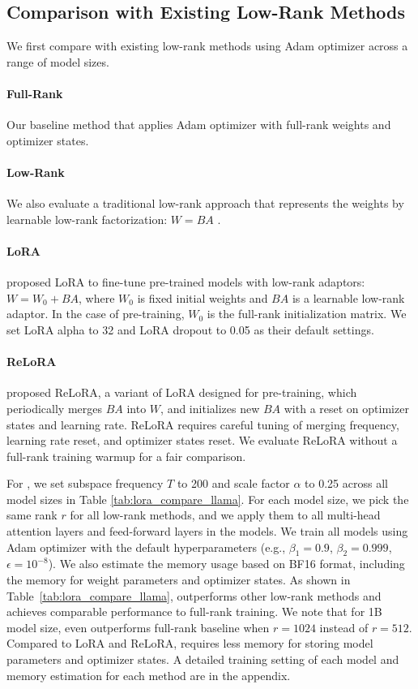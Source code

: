 \subsection{Comparison with Existing Low-Rank Methods}

We first compare \lowrank{} with existing low-rank methods using Adam optimizer across a range of model sizes.
\paragraph{Full-Rank}
Our baseline method that applies Adam optimizer with full-rank weights and optimizer states.
\paragraph{Low-Rank}
We also evaluate a traditional low-rank approach that represents the weights by learnable low-rank factorization: $W = BA$ \citep{kamalakaraExploringLowRank2022}.
\paragraph{LoRA}
\citet{huLoRALowRankAdaptation2021} proposed LoRA to fine-tune pre-trained models with low-rank adaptors: $W = W_0 + BA$, where $W_0$ is fixed initial weights and $BA$ is a learnable low-rank adaptor. In the case of pre-training, $W_0$ is the full-rank initialization matrix.
We set LoRA alpha to 32 and LoRA dropout to 0.05 as their default settings.
\paragraph{ReLoRA}
\citet{lialinReLoRAHighRankTraining2023} proposed ReLoRA, a variant of LoRA designed for pre-training, which periodically merges $BA$ into $W$, and initializes new $BA$ with a reset on optimizer states and learning rate. ReLoRA requires careful tuning of merging frequency, learning rate reset, and optimizer states reset. We evaluate ReLoRA without a full-rank training warmup for a fair comparison.


For \lowrank{}, we set subspace frequency $T$ to 200 and scale factor $\alpha$ to 0.25 across all model sizes in Table \ref{tab:lora_compare_llama}.
For each model size, we pick the same rank $r$ for all low-rank methods, and we apply them to all multi-head attention layers and feed-forward layers in the models.
We train all models using Adam optimizer with the default hyperparameters (e.g., $\beta_1=0.9$, $\beta_2=0.999$, $\epsilon=10^{-8}$).
We also estimate the memory usage based on BF16 format, including the memory for weight parameters and optimizer states.
As shown in Table~\ref{tab:lora_compare_llama}, \lowrank{} outperforms other low-rank methods and achieves comparable performance to full-rank training.
We note that for 1B model size, \lowrank{} even outperforms full-rank baseline when $r=1024$ instead of $r=512$.
Compared to LoRA and ReLoRA, \lowrank{} requires less memory for storing model parameters and optimizer states. 
A detailed training setting of each model and memory estimation for each method are in the appendix.

